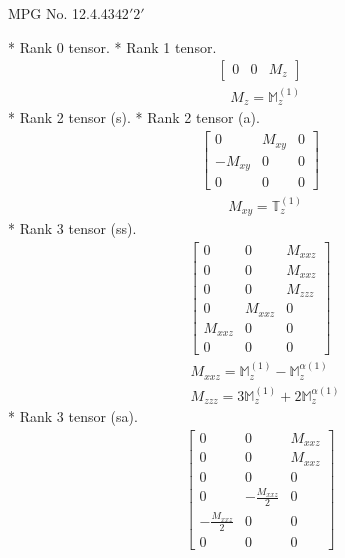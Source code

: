 \documentclass[fleqn,8pt,landscape]{jsarticle}
\begin{document}
\setcounter{MaxMatrixCols}{32}

\renewcommand{\tablename}{Table~}
\renewcommand{\figurename}{Figure~}
\begin{center}
\LARGE
MPG No. 12.4.43\quad$42'2'$
\end{center}
* Rank 0 tensor.
* Rank 1 tensor.
\begin{align*}
\begin{bmatrix} 0 & 0 & M_{z} \end{bmatrix}
\end{align*}
\begin{align*}
& M_{z} = \mathbb{M}_{z}^{(1)}
\end{align*}
* Rank 2 tensor (s).
* Rank 2 tensor (a).
\begin{align*}
\begin{bmatrix} 0 & M_{xy} & 0 \\ - M_{xy} & 0 & 0 \\ 0 & 0 & 0 \end{bmatrix}
\end{align*}
\begin{align*}
& M_{xy} = \mathbb{T}_{z}^{(1)}
\end{align*}
* Rank 3 tensor (ss).
\begin{align*}
\begin{bmatrix} 0 & 0 & M_{xxz} \\ 0 & 0 & M_{xxz} \\ 0 & 0 & M_{zzz} \\ 0 & M_{xxz} & 0 \\ M_{xxz} & 0 & 0 \\ 0 & 0 & 0 \end{bmatrix}
\end{align*}
\begin{align*}
& M_{xxz} = \mathbb{M}_{z}^{(1)} - \mathbb{M}_{z}^{\alpha(1)} \\
& M_{zzz} = 3 \mathbb{M}_{z}^{(1)} + 2 \mathbb{M}_{z}^{\alpha(1)}
\end{align*}
* Rank 3 tensor (sa).
\begin{align*}
\begin{bmatrix} 0 & 0 & M_{xxz} \\ 0 & 0 & M_{xxz} \\ 0 & 0 & 0 \\ 0 & - \frac{M_{xxz}}{2} & 0 \\ - \frac{M_{xxz}}{2} & 0 & 0 \\ 0 & 0 & 0 \end{bmatrix}
\end{align*}
\end{document}
